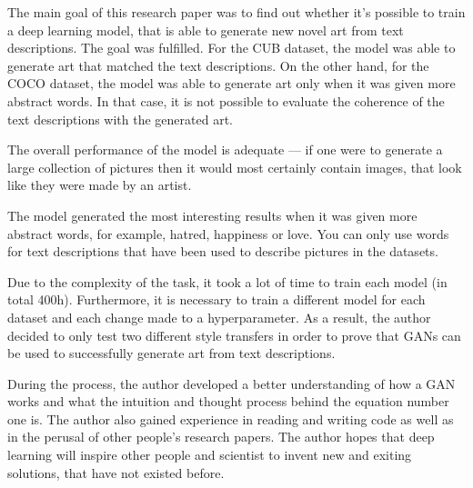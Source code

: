 \documentclass{vilgym}
\begin{document}
	The main goal of this research paper was to find out whether it's possible to train a deep learning model, that is able to generate new novel art from text descriptions. The goal was fulfilled. For the CUB dataset, the model was able to generate art that matched the text descriptions. On the other hand, for the COCO dataset, the model was able to generate art only when it was given more abstract words. In that case, it is not possible to evaluate the coherence of the text descriptions with the generated art.  

    The overall performance of the model is adequate --- if one were to generate a large collection of pictures then it would most certainly contain images, that look like they were made by an artist.

	The model generated the most interesting results when it was given more abstract words, for example, hatred, happiness or love. You can only use words for text descriptions that have been used to describe pictures in the datasets.

	Due to the complexity of the task, it took a lot of time to train each model (in total 400h). Furthermore, it is necessary to train a different model for each dataset and each change made to a hyperparameter. As a result, the author decided to only test two different style transfers in order to prove that GANs can be used to successfully generate art from text descriptions.
    
 	During the process, the author developed a better understanding of how a GAN works and what the intuition and thought process behind the equation number one is. The author also gained experience in reading and writing code as well as in the perusal of other people's research papers. The author hopes that deep learning will inspire other people and scientist to invent new and exiting solutions, that have not existed before.
    
	\nocite{*} %
	\printbibliography[title={Kasutatud allikad}]

	\appendices
	
\end{document}
